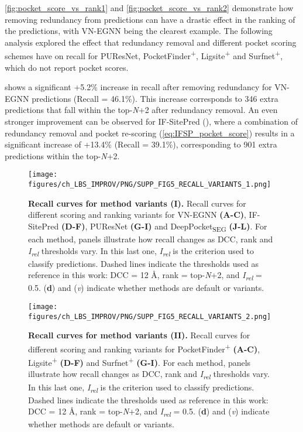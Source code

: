 \autoref{fig:pocket_score_vs_rank1} and \autoref{fig:pocket_score_vs_rank2} demonstrate how removing redundancy from predictions can have a drastic effect in the ranking of the predictions, with VN-EGNN being the clearest example. The following analysis explored the effect that redundancy removal and different pocket scoring schemes have on recall for PUResNet, PocketFinder\textsuperscript{+}, Ligsite\textsuperscript{+} and Surfnet\textsuperscript{+}, which do not report pocket scores.

 shows a significant +5.2\% increase in recall after removing redundancy for VN-EGNN predictions (Recall = 46.1\%). This increase corresponds to 346 extra predictions that fall within the top-\textit{N}+2 after redundancy removal. An even stronger improvement can be observed for IF-SitePred (), where a combination of redundancy removal and pocket re-scoring (\autoref{eq:IFSP_pocket_score}) results in a significant increase of +13.4\% (Recall = 39.1\%), corresponding to 901 extra predictions within the top-\textit{N}+2.

\begin{figure}[htbp!]
    \centering
    \texttt{[image: figures/ch\_LBS\_IMPROV/PNG/SUPP\_FIG5\_RECALL\_VARIANTS\_1.png]}
    \caption[Recall curves for method variants (I)]{\textbf{Recall curves for method variants (I).} Recall curves for different scoring and ranking variants for VN-EGNN \textbf{(A-C)}, IF-SitePred \textbf{(D-F)}, PUResNet \textbf{(G-I)} and DeepPocket\textsubscript{SEG} \textbf{(J-L)}. For each method, panels illustrate how recall changes as DCC, rank and \textit{I\textsubscript{rel}} thresholds vary. In this last one, \textit{I\textsubscript{rel}} is the criterion used to classify predictions. Dashed lines indicate the thresholds used as reference in this work: DCC = 12 \AA{}, rank = top-\textit{N}+2, and \textit{I\textsubscript{rel}} = 0.5. (\textbf{d}) and (\textit{v}) indicate whether methods are default or variants.}
    \label{fig:pocker_recall_variants1}
\end{figure}

\begin{figure}[htb!]
    \centering
    \texttt{[image: figures/ch\_LBS\_IMPROV/PNG/SUPP\_FIG5\_RECALL\_VARIANTS\_2.png]}
    \caption[Recall curves for method variants (II)]{\textbf{Recall curves for method variants (II).} Recall curves for different scoring and ranking variants for PocketFinder\textsuperscript{+} \textbf{(A-C)}, Ligsite\textsuperscript{+} \textbf{(D-F)} and Surfnet\textsuperscript{+} \textbf{(G-I)}. For each method, panels illustrate how recall changes as DCC, rank and \textit{I\textsubscript{rel}} thresholds vary. In this last one, \textit{I\textsubscript{rel}} is the criterion used to classify predictions. Dashed lines indicate the thresholds used as reference in this work: DCC = 12 \AA{}, rank = top-\textit{N}+2, and \textit{I\textsubscript{rel}} = 0.5. (\textbf{d}) and (\textit{v}) indicate whether methods are default or variants.}
    \label{fig:pocker_recall_variants2}
\end{figure}


